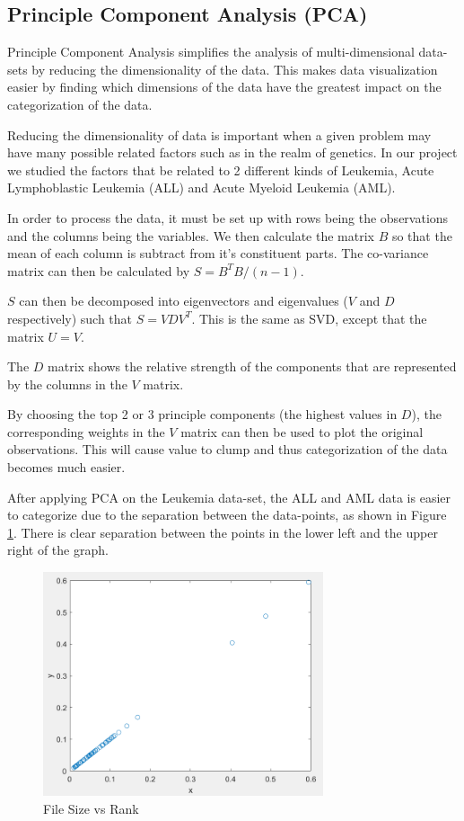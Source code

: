 \documentclass[conference]{IEEEtran}
\begin{document}
\subsection{Principle Component Analysis (PCA)}
Principle Component Analysis simplifies the analysis of multi-dimensional data-sets by 
reducing the dimensionality of the data. This makes data visualization easier by finding
which dimensions of the data have the greatest impact on the categorization of the data. 

Reducing the dimensionality of data is important when a given problem may have many possible
related factors such as in the realm of genetics. In our project we studied the factors that 
be related to 2 different kinds of Leukemia, Acute Lymphoblastic Leukemia (ALL) and Acute Myeloid
Leukemia (AML). 

In order to process the data, it must be set up with rows being the observations and the columns 
being the variables. We then calculate the matrix $B$ so that the mean of each column is subtract 
from it's constituent parts. The co-variance matrix can then be calculated by $S=B^T B/(n-1)$.

$S$ can then be decomposed into eigenvectors and eigenvalues ($V$ and $D$ respectively) such that 
$S = V D V^T$. This is the same as SVD, except that the matrix $U = V$.

The $D$ matrix shows the relative strength of the components that are represented by the columns
in the $V$ matrix.

By choosing the top 2 or 3 principle components (the highest values in $D$), the corresponding 
weights in the $V$ matrix can then be used to plot the original observations. This will cause 
value to clump and thus categorization of the data becomes much easier.

After applying PCA on the Leukemia data-set, the ALL and AML data is easier to categorize due to
the separation between the data-points, as shown in Figure \ref{pca}. There is clear separation 
between the points in the lower left and the upper right of the graph. 

\begin{figure}
	\centering
	\includegraphics[width=3.25in]{PCA_1.png}
	\caption{File Size vs Rank}
	\label{pca}
\end{figure}
\end{document}
